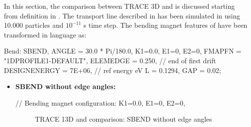In this section, the comparison between TRACE 3D and \opalt is discussed starting from  definition in \opalt. The transport line described in  has been simulated in \opal using 10.000 particles and $10^{-11}$ s time step. The bending magnet features of  have been transformed in \opal language as:

\begin{example}
Bend: SBEND, ANGLE = 30.0 * Pi/180.0,
             K1=0.0,
             E1=0, E2=0,
             FMAPFN = "1DPROFILE1-DEFAULT",
             ELEMEDGE = 0.250,  // end of first drift
             DESIGNENERGY = 7E+06,  // ref energy eV
             L = 0.1294,
             GAP = 0.02;
\end{example}

\begin{itemize}

\item \textbf{SBEND without edge angles:}

\begin{example}
// Bending magnet configuration:
K1=0.0,
E1=0, E2=0,
\end{example}

\begin{figure}[!htb]
\begin{center}
    \hspace{1.8cm}
    \caption{TRACE 13D and \opal comparison: SBEND without edge angles}
    \label{fig:SBEND_noEdge}
\end{center}
 \end{figure}


\end{itemize}
